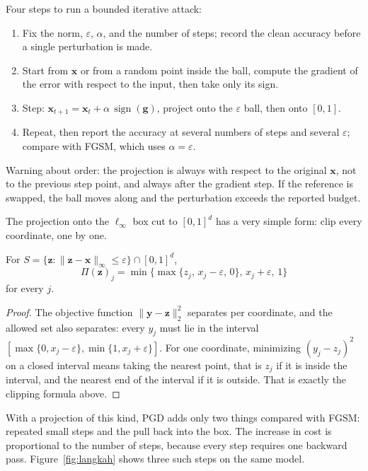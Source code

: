 \begin{resep}
Four steps to run a bounded iterative attack:
\begin{enumerate}
  \item Fix the norm, $\varepsilon$, $\alpha$, and the number of steps; record the
        clean accuracy before a single perturbation is made.
  \item Start from $\mathbf{x}$ or from a random point inside the ball, compute the
        gradient of the error with respect to the input, then take only its sign.
  \item Step: $\mathbf{x}_{t+1}=\mathbf{x}_t+\alpha\,\operatorname{sign}(\mathbf{g})$,
        project onto the $\varepsilon$ ball, then onto $[0,1]$.
  \item Repeat, then report the accuracy at several numbers of steps and several
        $\varepsilon$; compare with FGSM, which uses $\alpha=\varepsilon$.
\end{enumerate}
Warning about order: the projection is always with respect to the original
$\mathbf{x}$, not to the previous step point, and always after the gradient step.
If the reference is swapped, the ball moves along and the perturbation exceeds the
reported budget.
\end{resep}

The projection onto the $\ell_\infty$ box cut to $[0,1]^d$ has a very
simple form: clip every coordinate, one by one.

\begin{proposisi}
For $S=\{\mathbf{z}:\lVert\mathbf{z}-\mathbf{x}\rVert_\infty\le\varepsilon\}
\cap[0,1]^{d}$,
\[
  \Pi(\mathbf{z})_j=\min\bigl\{\max\{z_j,\,x_j-\varepsilon,\,0\},\,
  x_j+\varepsilon,\,1\bigr\}
\]
for every $j$.
\end{proposisi}

\begin{proof}
The objective function $\lVert\mathbf{y}-\mathbf{z}\rVert_2^2$ separates per
coordinate, and the allowed set also separates: every $y_j$ must lie in the interval
$[\max\{0,x_j-\varepsilon\},\min\{1,x_j+\varepsilon\}]$. For one coordinate,
minimizing $(y_j-z_j)^2$ on a closed interval means taking the nearest point, that
is $z_j$ if it is inside the interval, and the nearest end of the interval if it is
outside. That is exactly the clipping formula above.
\end{proof}

With a projection of this kind, PGD adds only two things compared with FGSM:
repeated small steps and the pull back into the box. The increase in cost is
proportional to the number of steps, because every step requires one backward pass.
Figure~\ref{fig:langkah} shows three such steps on the same model.

